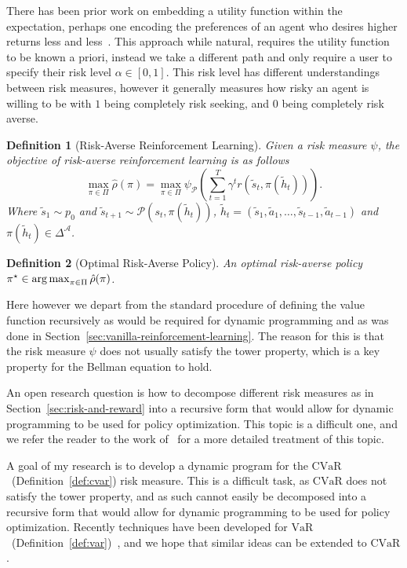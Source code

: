 \documentclass[10pt]{article}
\newtheorem{definition}{Definition}
\renewcommand{\cite}{\citep}
\newcommand{\cvar}{\text{CVaR}}
\newcommand{\var}{\text{VaR}}
\theoremstyle{plain}
\theoremstyle{remark}
\begin{document}
There has been prior work on embedding a utility function within the expectation, perhaps one encoding the preferences of an agent who
desires higher returns less and less~\cite{howard1972}. This approach while natural, requires the utility function to be known a priori, instead we take a different path and only require a user to specify their risk level $\alpha \in [0,1]$. This risk level has different understandings between risk measures, however it generally measures how risky an agent is willing to be with $1$ being completely risk seeking, and $0$ being completely risk averse.

\begin{definition}[Risk-Averse Reinforcement Learning]\label{def:risk_averse_rl}
        Given a risk measure $\psi$, the objective of risk-averse reinforcement learning is as follows
        \[
                \max_{\pi \in \Pi} \hat{\rho}(\pi) = \max_{\pi \in \Pi} \psi_\mathcal{P} \left( \sum_{t=1}^{T} \gamma^t r(\tilde{s}_t, \pi(\tilde{h}_t)) \right).
        \]
        Where $\tilde{s}_1 \sim p_0$ and $\tilde{s}_{t+1} \sim \mathcal{P}(s_t, \pi(\tilde{h}_t))$, $\tilde{h}_t = (\tilde{s}_1, \tilde{a}_1, \ldots, \tilde{s}_{t-1}, \tilde{a}_{t-1})$ and $\pi(\tilde{h}_t) \in \Delta^\mathcal{A}$.
\end{definition}

\begin{definition}[Optimal Risk-Averse Policy]\label{def:optimal_risk_averse_policy}
        An optimal risk-averse policy $\pi^\star \in \operatorname*{arg\,max}_{\pi \in \Pi} \hat{\rho}(\pi)$.
\end{definition}

Here however we depart from the standard procedure of defining the value function recursively as would be required for dynamic programming and as was done in Section~\ref{sec:vanilla-reinforcement-learning}.
The reason for this is that the risk measure $\psi$ does not usually satisfy the tower property, which is a key property for the Bellman equation to hold.

An open research question is how to decompose different risk measures as in Section~\ref{sec:risk-and-reward} into a recursive form that would allow for dynamic programming to be used for policy optimization.
This topic is a difficult one, and we refer the reader to the work of~\cite{Hau2023OnDP, Bauerle2011, follmer2016} for a more detailed treatment of this topic.

A goal of my research is to develop a dynamic program for the $\cvar$~(Definition~\ref{def:cvar}) risk measure. 
This is a difficult task, as $\cvar$ does not satisfy the tower property, and as such cannot easily be decomposed into a recursive form that would allow for dynamic programming to be used for policy optimization.
Recently techniques have been developed for
$\var$~(Definition~\ref{def:var})~\cite{Hau2023OnDP}, and we hope that
similar ideas can be extended to $\cvar$.


\end{document}
